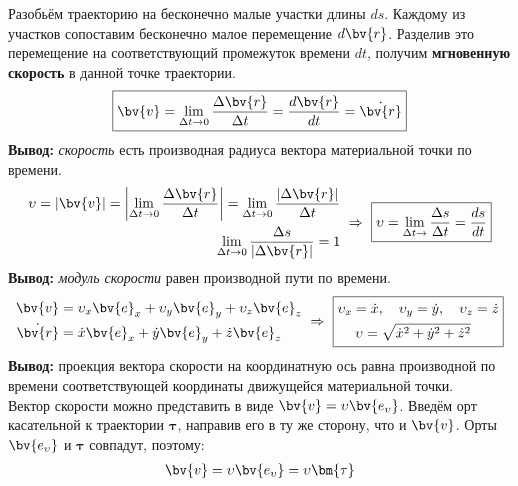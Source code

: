 Разобьём траекторию на бесконечно малые участки длины $ds$. Каждому из участков сопоставим бесконечно малое перемещение $d\bv{r}$. Разделив это перемещение на соответствующий промежуток времени $dt$, получим \textbf{мгновенную скорость} в данной точке траектории.
\begin{gather}
    \boxed{\bv{v} = \lim_{\Delta t \to 0} \frac{\Delta \bv{r}}{\Delta t} = \frac{d\bv{r}}{dt} = \dot{\bv{r}}}
\end{gather}
\textbf{Вывод:} \textit{скорость} есть производная радиуса вектора материальной точки по времени.
\begin{gather}
    \begin{aligned}
        \upsilon = |\bv{v}| = \left| \lim_{\Delta t \to 0} \frac{\Delta \bv{r}}{\Delta t} \right| = \lim_{\Delta t \to 0} \frac{|\Delta \bv{r}|}{\Delta t} & \\
        \lim_{\Delta t \to 0} \frac{\Delta s}{|\Delta \bv{r}|} = 1 &
    \end{aligned}\ \Rightarrow\ \boxed{\upsilon = \lim_{\Delta t \to} \frac{\Delta s}{\Delta t} = \frac{ds}{dt}}
\end{gather}
\textbf{Вывод:} \textit{модуль скорости} равен производной пути по времени. 
\begin{gather*}
    \begin{aligned}
        \bv{v} &= \upsilon_x \bv{e}_x + \upsilon_y \bv{e}_y + \upsilon_z \bv{e}_z \\
        \dot{\bv{r}} &= \dot{x} \bv{e}_x + \dot{y} \bv{e}_y + \dot{z} \bv{e}_z
    \end{aligned}\ \Rightarrow\ \boxed{
        \begin{aligned}
            \upsilon_x = \dot{x},\quad \upsilon_y = \dot{y},\quad \upsilon_z = \dot{z} \\ 
            \upsilon = \sqrt{\dot{x}^2 + \dot{y}^2 + \dot{z}^2}\qquad
        \end{aligned}}
\end{gather*}
\textbf{Вывод:} проекция вектора скорости на координатную ось равна производной по времени соответствующей координаты движущейся материальной точки. \\[1ex]
Вектор скорости можно представить в виде $\bv{v} = \upsilon\bv{e_\upsilon}$. Введём орт касательной к траектории $\bm{\tau}$, направив его в ту же сторону, что и $\bv{v}$. Орты $\bv{e_\upsilon}$ и $\bm{\tau}$ совпадут, поэтому:
\begin{gather}
    \bv{v} = \upsilon \bv{e_\upsilon} = \upsilon \bm{\tau}
\end{gather}
